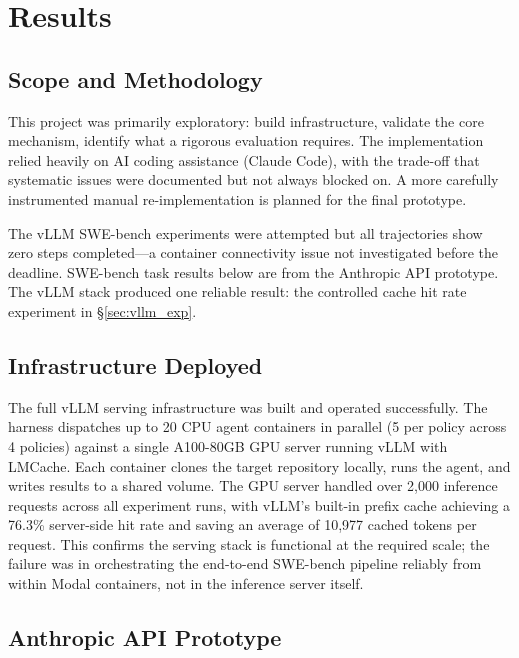 \documentclass[letterpaper,twocolumn,10pt]{article}
\begin{document}
\section{Results}
\label{sec:eval}

\subsection{Scope and Methodology}

This project was primarily exploratory: build infrastructure, validate the
core mechanism, identify what a rigorous evaluation requires. The
implementation relied heavily on AI coding assistance (Claude Code), with the
trade-off that systematic issues were documented but not always blocked on.
A more carefully instrumented manual re-implementation is planned for the
final prototype.

The vLLM SWE-bench experiments were attempted but all trajectories show zero
steps completed---a container connectivity issue not investigated before the
deadline. SWE-bench task results below are from the Anthropic API prototype.
The vLLM stack produced one reliable result: the controlled cache hit rate
experiment in \S\ref{sec:vllm_exp}.

\subsection{Infrastructure Deployed}

The full vLLM serving infrastructure was built and operated successfully.
The harness dispatches up to 20 CPU agent containers in parallel (5 per
policy across 4 policies) against a single A100-80GB GPU server running
vLLM with LMCache. Each container clones the target repository locally,
runs the agent, and writes results to a shared volume. The GPU server
handled over 2,000 inference requests across all experiment runs, with
vLLM's built-in prefix cache achieving a 76.3\% server-side hit rate and
saving an average of 10,977 cached tokens per request. This confirms the
serving stack is functional at the required scale; the failure was in
orchestrating the end-to-end SWE-bench pipeline reliably from within
Modal containers, not in the inference server itself.

\subsection{Anthropic API Prototype}
\end{document}
